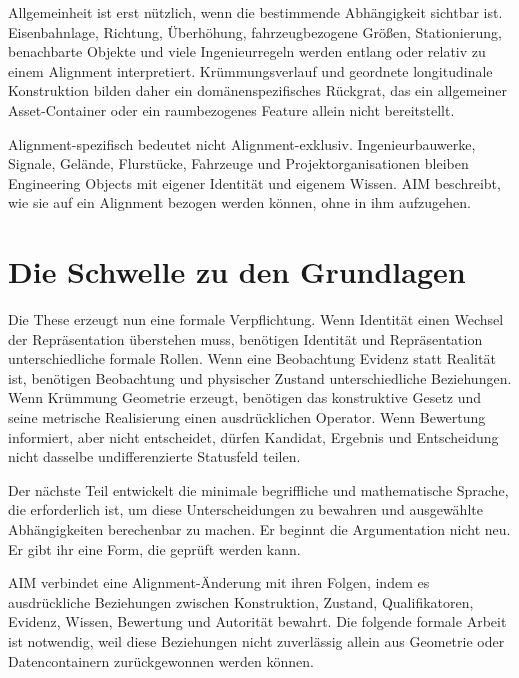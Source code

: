 Allgemeinheit ist erst nützlich, wenn die bestimmende Abhängigkeit sichtbar
ist. Eisenbahnlage, Richtung, Überhöhung, fahrzeugbezogene Größen,
Stationierung, benachbarte Objekte und viele Ingenieurregeln werden entlang
oder relativ zu einem Alignment interpretiert. Krümmungsverlauf und geordnete
longitudinale Konstruktion bilden daher ein domänenspezifisches Rückgrat, das
ein allgemeiner Asset-Container oder ein raumbezogenes Feature allein nicht
bereitstellt.

Alignment-spezifisch bedeutet nicht Alignment-exklusiv. Ingenieurbauwerke,
Signale, Gelände, Flurstücke, Fahrzeuge und Projektorganisationen bleiben
Engineering Objects mit eigener Identität und eigenem Wissen. AIM beschreibt,
wie sie auf ein Alignment bezogen werden können, ohne in ihm aufzugehen.

\section{Die Schwelle zu den Grundlagen}

Die These erzeugt nun eine formale Verpflichtung. Wenn Identität einen Wechsel
der Repräsentation überstehen muss, benötigen Identität und Repräsentation
unterschiedliche formale Rollen. Wenn eine Beobachtung Evidenz statt Realität
ist, benötigen Beobachtung und physischer Zustand unterschiedliche
Beziehungen. Wenn Krümmung Geometrie erzeugt, benötigen das konstruktive Gesetz
und seine metrische Realisierung einen ausdrücklichen Operator. Wenn Bewertung
informiert, aber nicht entscheidet, dürfen Kandidat, Ergebnis und Entscheidung
nicht dasselbe undifferenzierte Statusfeld teilen.

Der nächste Teil entwickelt die minimale begriffliche und mathematische
Sprache, die erforderlich ist, um diese Unterscheidungen zu bewahren und
ausgewählte Abhängigkeiten berechenbar zu machen. Er beginnt die Argumentation
nicht neu. Er gibt ihr eine Form, die geprüft werden kann.

\begin{summary}
AIM verbindet eine Alignment-Änderung mit ihren Folgen, indem es ausdrückliche
Beziehungen zwischen Konstruktion, Zustand, Qualifikatoren, Evidenz, Wissen,
Bewertung und Autorität bewahrt. Die folgende formale Arbeit ist notwendig,
weil diese Beziehungen nicht zuverlässig allein aus Geometrie oder
Datencontainern zurückgewonnen werden können.
\end{summary}
